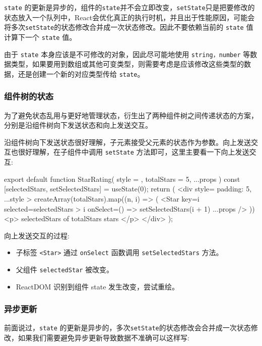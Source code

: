 \texttt{state} 的更新是异步的，组件的\texttt{state}并不会立即改变，\texttt{setState}只是把要修改的状态放入一个队列中，React会优化真正的执行时机，并且出于性能原因，可能会将多次\texttt{setState}的状态修改合并成一次状态修改。因此不要依赖当前的 \texttt{state} 值计算下一个 \texttt{state} 值。

由于 \texttt{state} 本身应该是不可修改的对象，因此尽可能地使用 \texttt{string，number} 等数据类型，如果要用到数组或其他可变类型，则需要考虑是应该修改这些类型的数据，还是创建一个新的对应类型传给 \texttt{state}。

\subsubsection*{组件树的状态}

为了避免状态乱用与更好地管理状态，衍生出了两种组件树之间传递状态的方案，分别是沿组件树向下发送状态和向上发送交互。

沿组件树向下发送状态很好理解，子元素接受父元素的状态作为参数。向上发送交互也很好理解，在子组件中调用 \texttt{setState} 方法即可，这里主要看一下向上发送交互:

\begin{JavaScript}
export default function StarRating({ style = {}, totalStars = 5, ...props }) {
  const [selectedStars, setSelectedStars] = useState(0);
  return (
    <div style={{ padding: 5, ...style }}>
      {createArray(totalStars).map((n, i) => (
        <Star
          key={i}
          selected={selectedStars > i}
          onSelect={() => setSelectedStars(i + 1)}
          {...props}
        />
      ))}
      <p>
        {selectedStars} of {totalStars} stars
      </p>
    </div>
  );
}
\end{JavaScript}

向上发送交互的过程:
\begin{itemize}
    \item 子标签 \texttt{<Star>} 通过 \texttt{onSelect} 函数调用 \texttt{setSelectedStars} 方法。
    \item 父组件 \texttt{selectedStar} 被改变。
    \item ReactDOM 识别到组件 state 发生改变，尝试重绘。
\end{itemize}

\subsubsection*{异步更新}

前面说过，\texttt{state} 的更新是异步的，多次\texttt{setState}的状态修改会合并成一次状态修改，如果我们需要避免异步更新导致数据不准确可以这样写:

